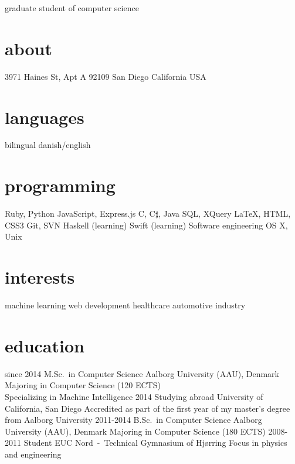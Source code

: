 \documentclass{afriggeri-cv/friggeri-cv}
\newcommand{\aau}{%
  Aalborg University (AAU), Denmark
}
\begin{document}
       {graduate student of computer science}

\begin{aside}
  \section{about}
    3971 Haines St, Apt A
    92109 San Diego
    California
    USA
    ~
  \section{languages}
    bilingual danish/english
  \section{programming}
    Ruby, Python
    JavaScript, Express.js
    C, C$\sharp$, Java
    SQL, XQuery
    \LaTeX, HTML, CSS3
    Git, SVN
    Haskell (learning)
    Swift (learning)
    Software engineering
    OS X, Unix
  \section{interests}
    machine learning
    web development
    healthcare
    automotive industry
\end{aside}

\section{education}

\begin{entrylist}
  \entry
    {since 2014}
    {M.Sc.\ {\normalfont in Computer Science}}
    {\aau}
    {Majoring in Computer Science (120 ECTS)\\
    Specializing in Machine Intelligence}
  \entry
    {2014}
    {Studying abroad}
    {University of California, San Diego}
    {Accredited as part of the first year of my master's degree from Aalborg University}
  \entry
    {2011-2014}
    {B.Sc.\ {\normalfont in Computer Science}}
    {\aau}
    {Majoring in Computer Science (180 ECTS)}
  \entry
    {2008-2011}
    {Student}
    {EUC Nord~-~Technical Gymnasium of Hjørring}
    {Focus in physics and engineering}
\end{entrylist}
\end{document}

